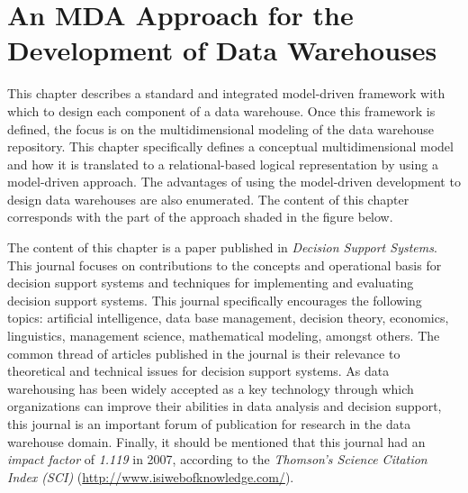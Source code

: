 %
%
%



\chapter{An MDA Approach for the Development of Data Warehouses}
\label{c3} %


This chapter describes a standard and integrated model-driven
framework with which to design each component of a data warehouse.
Once this framework is defined, the focus is on the multidimensional
modeling of the data warehouse repository. This chapter specifically
defines a conceptual multidimensional model and how it is translated
to a relational-based logical representation by using a model-driven
approach. The advantages of using the model-driven development to
design data warehouses are also enumerated. The content of this
chapter corresponds with the part of the approach shaded in the
figure below.


The content of this chapter is a paper published in \emph{Decision
Support Systems}. This journal focuses on contributions to the
concepts and operational basis for decision support systems and
techniques for implementing and evaluating decision support systems.
This journal specifically encourages the following topics:
artificial intelligence, data base management, decision theory,
economics, linguistics, management science, mathematical modeling,
amongst others. The common thread of articles published in the
journal is their relevance to theoretical and technical issues for
decision support systems. As data warehousing has been widely
accepted as a key technology through which organizations can improve
their abilities in data analysis and decision support, this journal
is an important forum of publication for research in the data
warehouse domain. Finally, it should be mentioned that this journal
had an \emph{impact factor} of \emph{1.119} in 2007, according to
the \emph{Thomson's Science Citation Index (SCI)}
(\url{http://www.isiwebofknowledge.com/}).






%
